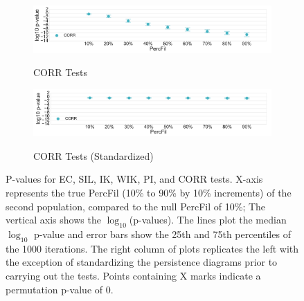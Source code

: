 \documentclass[12pt]{article}
\begin{document}
\begin{center}
\begin{figure}[htp!]
\begin{subfigure}{.48\textwidth}
        \label{fig:all_weight_normed}
      \end{subfigure}
      \begin{subfigure}{.48\textwidth}
        \caption{CORR Tests}
        \includegraphics[width=\linewidth, height = .75in]{figure_8_all_correlation_group.pdf}
        \label{fig:all_corr}
      \end{subfigure}
      \begin{subfigure}{.48\textwidth}
        \caption{CORR Tests (Standardized)}
        \includegraphics[width=\linewidth, height = .75in]{figure_8_all_correlation_group_normed.pdf}
        \label{fig:all_corr_normed}
      \end{subfigure}
      \caption{P-values for EC, SIL, IK, WIK, PI, and CORR tests. X-axis represents the true PercFil (10\% to 90\% by 10\% increments) of the second population, compared to the null PercFil of 10\%;
      The vertical axis shows the $\log_{10}$(p-values). The lines plot the median $\log_{10}$ p-value and error bars show the 25th and 75th percentiles of the 1000 iterations.
 The right column of plots replicates the left with the exception of standardizing the persistence diagrams prior to carrying out the tests.    Points containing X marks indicate a permutation p-value of 0.
      }
      \label{fig:linesUnnormApp}
    \end{figure}
  \end{center}





\end{document}
